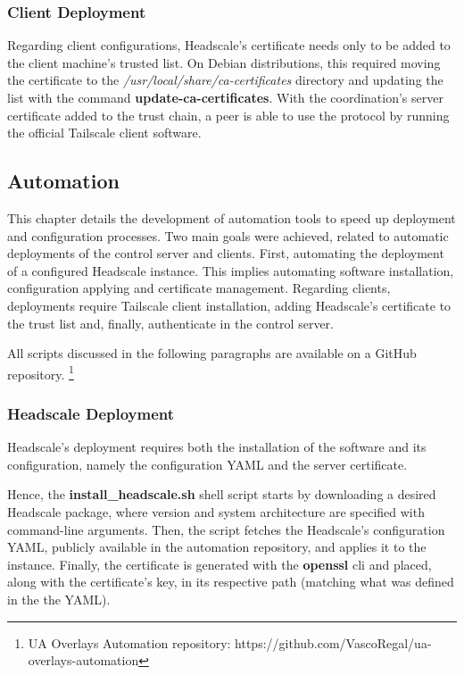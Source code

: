 \documentclass[11pt,twoside,a4paper]{report}
\begin{document}
\subsubsection{Client Deployment}

Regarding client configurations, Headscale's certificate needs only to be added to the client machine's trusted list. On Debian distributions, this required moving the certificate to the \emph{/usr/local/share/ca-certificates} directory and updating the list with the command \textbf{update-ca-certificates}. With the coordination's server certificate added to the trust chain, a peer is able to use the protocol by running the official Tailscale client software.

\subsection{Automation}

This chapter details the development of automation tools to speed up deployment and configuration processes. Two main goals were achieved, related to automatic deployments of the control server and clients. First, automating the deployment of a configured Headscale instance. This implies automating software installation, configuration applying and certificate management. Regarding clients, deployments require Tailscale client installation, adding Headscale's certificate to the trust list and, finally, authenticate in the control server.

All scripts discussed in the following paragraphs are available on a GitHub repository. \footnote{UA Overlays Automation repository: https://github.com/VascoRegal/ua-overlays-automation}

\subsubsection{Headscale Deployment}

Headscale's deployment requires both the installation of the software and its configuration, namely the configuration YAML and the server certificate.

Hence, the \textbf{install\_headscale.sh} shell script starts by downloading a desired Headscale package, where version and system architecture are specified with command-line arguments. Then, the script fetches the Headscale's configuration YAML, publicly available in the automation repository, and applies it to the instance. Finally, the certificate is generated with the \textbf{openssl} \ac{cli} and placed, along with the certificate's key, in its respective path (matching what was defined in the the YAML).
\end{document}
